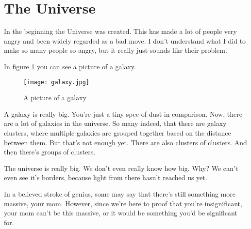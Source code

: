 \maketitle
\section*{The Universe}
In the beginning the Universe was created. This has made a lot of people very angry and been widely regarded as a bad move.
I don't understand what I did to make so many people so angry, but it really just sounds like their problem.

In figure \ref{fig:universe} you can see a picture of a galaxy.

\begin{figure}[h]
  \center
  \texttt{[image: galaxy.jpg]}
  \caption{A picture of a galaxy}
  \label{fig:universe}
\end{figure}

A galaxy is really big. You're just a tiny spec of dust in comparison. Now, there are a lot of galaxies in the universe.
So many indeed, that there are galaxy clusters, where multiple galaxies are grouped together based on the distance between them.
But that's not enough yet. There are also clusters of clusters. And then there's groups of clusters.

The universe is really big. We don't even really know how big. Why? We can't even see it's borders, because light from there hasn't reached us yet.

In a believed stroke of genius, some may say that there's still something more massive, your mom. However, since we're here to proof that you're insignificant,
your mom can't be this massive, or it would be something you'd be significant for.

\pagebreak

